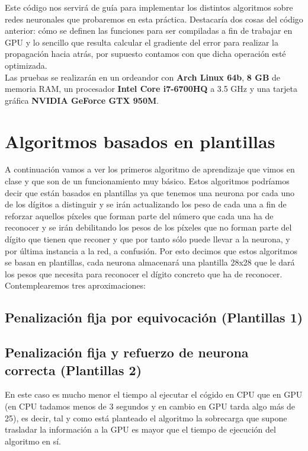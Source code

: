 \documentclass[10pt,a4paper]{article}
\begin{document}
Este código nos servirá de guía para implementar los distintos algoritmos sobre redes neuronales que probaremos en esta práctica. Destacaría dos cosas del código anterior: cómo se definen las funciones para ser compiladas a fin de trabajar en GPU y lo sencillo que resulta calcular el gradiente del error para realizar la propagación hacia atrás, por supuesto contamos con que dicha operación esté optimizada.\\

Las pruebas se realizarán en un ordeandor con \textbf{Arch Linux 64b}, \textbf{8 GB} de memoria RAM, un procesador \textbf{Intel Core i7-6700HQ} a 3.5 GHz y una tarjeta gráfica \textbf{NVIDIA GeForce GTX 950M}.

\section{Algoritmos basados en plantillas}

A continuación vamos a ver los primeros algoritmo de aprendizaje que vimos en clase y que son de un funcionamiento muy básico. Estos algoritmos podríamos decir que están basados en plantillas ya que tenemos una neurona por cada uno de los dígitos a distinguir y se irán actualizando los peso de cada una a fin de reforzar aquellos píxeles que forman parte del número que cada una ha de reconocer y se irán debilitando los pesos de los píxeles que no forman parte del dígito que tienen que reconer y que por tanto sólo puede llevar a la neurona, y por última instancia a la red, a confusión. Por esto decimos que estos algoritmos se basan en plantillas, cada neurona almacenará una plantilla 28x28 que le dará los pesos que necesita para reconocer el dígito concreto que ha de reconocer. Contemplearemos tres aproximaciones:

\subsection{Penalización fija por equivocación (Plantillas 1)}
\subsection{Penalización fija y refuerzo de neurona correcta (Plantillas 2)}

En este caso es mucho menor el tiempo al ejecutar el cógido en CPU que en GPU (en CPU tadamos menos de 3 segundos y en cambio en GPU tarda algo más de 25), es decir, tal y como está planteado el algoritmo la sobrecarga que supone trasladar la información a la GPU es mayor que el tiempo de ejecución del algoritmo en sí.
\end{document}
